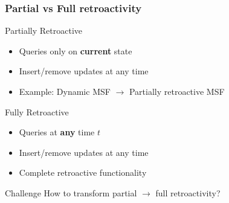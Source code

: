 \documentclass[fleqn]{beamer}
\begin{document}
\begin{frame}
    \frametitle{Partial vs Full retroactivity}
    
    \begin{block}{Partially Retroactive}
        \begin{itemize}
        \item Queries only on \textbf{current} state
        \item Insert/remove updates at any time
        \item Example: Dynamic MSF $\rightarrow$ Partially retroactive MSF
        \end{itemize}
    \end{block} \pause
    
    \begin{block}{Fully Retroactive}
        \begin{itemize}
        \item Queries at \textbf{any} time $t$
        \item Insert/remove updates at any time
        \item Complete retroactive functionality
        \end{itemize}
    \end{block} \pause
    
    \begin{alertblock}{Challenge}
        How to transform partial $\rightarrow$ full retroactivity?
    \end{alertblock}
\end{frame}
\end{document}
